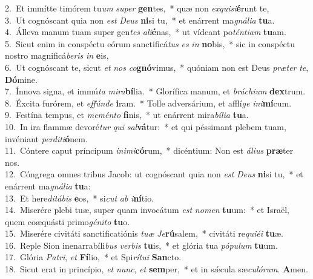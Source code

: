 {2.~}Et immítte timórem tu\textit{um} \textit{su}\textit{per} \textbf{gen}tes,~* quæ non \textit{ex}\textit{qui}\textit{si}\textbf{é}runt te,\\
{3.~}Ut cognóscant quia non \textit{est} \textit{De}\textit{us} \textbf{ni}si tu,~* et enárrent ma\textit{gná}\textit{li}\textit{a} \textbf{tu}a.\\
{4.~}Álleva manum tuam super gen\textit{tes} \textit{a}\textit{li}\textbf{é}nas,~* ut vídeant po\textit{tén}\textit{ti}\textit{am} \textbf{tu}am.\\
{5.~}Sicut enim in conspéctu eórum sanctificá\textit{tus} \textit{es} \textit{in} \textbf{no}bis,~* sic in conspéctu nostro magnificá\textit{be}\textit{ris} \textit{in} \textbf{e}is,\\
{6.~}Ut cognóscant te, sicut \textit{et} \textit{nos} \textit{co}\textbf{gnó}vimus,~* quóniam non est Deus \textit{præ}\textit{ter} \textit{te}, \textbf{Dó}mine.\\
{7.~}Ínnova signa, et immú\textit{ta} \textit{mi}\textit{ra}\textbf{bí}lia.~* Glorífica manum, et \textit{brá}\textit{chi}\textit{um} \textbf{dex}trum.\\
{8.~}Éxcita furórem, et \textit{ef}\textit{fún}\textit{de} \textbf{i}ram.~* Tolle adversárium, et afflí\textit{ge} \textit{i}\textit{ni}\textbf{mí}cum.\\
{9.~}Festína tempus, et \textit{me}\textit{mén}\textit{to} \textbf{fi}nis,~* ut enárrent mira\textit{bí}\textit{li}\textit{a} \textbf{tu}a.\\
{10.~}In ira flammæ devoré\textit{tur} \textit{qui} \textit{sal}\textbf{vá}tur:~* et qui péssimant plebem tuam, invéniant \textit{per}\textit{di}\textit{ti}\textbf{ó}nem.\\
{11.~}Cóntere caput príncipum \textit{i}\textit{ni}\textit{mi}\textbf{có}rum,~* dicéntium: Non est \textit{á}\textit{li}\textit{us} \textbf{præ}ter nos.\\
{12.~}Cóngrega omnes tribus Jacob: ut cognóscant quia non \textit{est} \textit{De}\textit{us} \textbf{ni}si tu,~* et enárrent ma\textit{gná}\textit{li}\textit{a} \textbf{tu}a:\\
{13.~}Et here\textit{di}\textit{tá}\textit{bis} \textbf{e}os,~* si\textit{cut} \textit{ab} \textit{i}\textbf{ní}tio.\\
{14.~}Miserére plebi tuæ, super quam invocátum \textit{est} \textit{no}\textit{men} \textbf{tu}um:~* et Israël, quem coæquásti primo\textit{gé}\textit{ni}\textit{to} \textbf{tu}o.\\
{15.~}Miserére civitáti sanctificatiónis \textit{tu}\textit{æ} \textit{Je}\textbf{rú}salem,~* civitáti re\textit{qui}\textit{é}\textit{i} \textbf{tu}æ.\\
{16.~}Reple Sion inenarrabíli\textit{bus} \textit{ver}\textit{bis} \textbf{tu}is,~* et glória tua \textit{pó}\textit{pu}\textit{lum} \textbf{tu}um.\\
{17.~}Glória \textit{Pa}\textit{tri}, \textit{et} \textbf{Fí}lio,~* et Spi\textit{rí}\textit{tu}\textit{i} \textbf{San}cto.\\
{18.~}Sicut erat in princípio, \textit{et} \textit{nunc}, \textit{et} \textbf{sem}per,~* et in sǽcula sæ\textit{cu}\textit{ló}\textit{rum}. \textbf{A}men.\\

